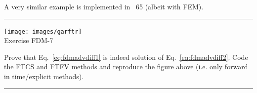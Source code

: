 A very similar example is implemented in \stone~65 (albeit with FEM).

\begin{center}
\begin{minipage}[t]{0.77\textwidth}
\par\noindent\rule{\textwidth}{0.4pt}

\begin{center}
\texttt{[image: images/garftr]} \\
{\color{orange}Exercise FDM-7}
\end{center}

Prove that Eq.~\eqref{eq:fdmadvdiff1} is indeed solution of Eq.~\eqref{eq:fdmadvdiff2}. 
Code the FTCS and FTFV methods and reproduce the figure above (i.e. only forward in time/explicit methods).

\par\noindent\rule{\textwidth}{0.4pt}
\end{minipage}
\end{center}

